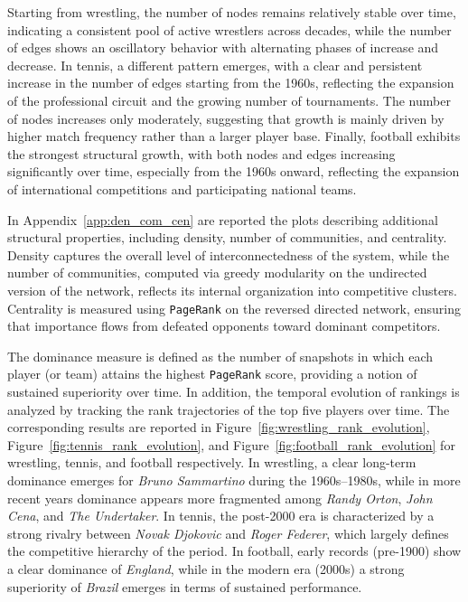 Starting from wrestling, the number of nodes remains relatively stable over time, indicating a consistent pool of active wrestlers across decades, while the number of edges shows an oscillatory behavior with alternating phases of increase and decrease. In tennis, a different pattern emerges, with a clear and persistent increase in the number of edges starting from the 1960s, reflecting the expansion of the professional circuit and the growing number of tournaments. The number of nodes increases only moderately, suggesting that growth is mainly driven by higher match frequency rather than a larger player base. Finally, football exhibits the strongest structural growth, with both nodes and edges increasing significantly over time, especially from the 1960s onward, reflecting the expansion of international competitions and participating national teams.

In Appendix~\ref{app:den_com_cen} are reported the plots describing additional structural properties, including density, number of communities, and centrality. Density captures the overall level of interconnectedness of the system, while the number of communities, computed via greedy modularity on the undirected version of the network, reflects its internal organization into competitive clusters. Centrality is measured using \texttt{PageRank} on the reversed directed network, ensuring that importance flows from defeated opponents toward dominant competitors.

The dominance measure is defined as the number of snapshots in which each player (or team) attains the highest \texttt{PageRank} score, providing a notion of sustained superiority over time. In addition, the temporal evolution of rankings is analyzed by tracking the rank trajectories of the top five players over time. The corresponding results are reported in Figure~\ref{fig:wrestling_rank_evolution}, Figure~\ref{fig:tennis_rank_evolution}, and Figure~\ref{fig:football_rank_evolution} for wrestling, tennis, and football respectively. In wrestling, a clear long-term dominance emerges for \textit{Bruno Sammartino} during the 1960s–1980s, while in more recent years dominance appears more fragmented among \textit{Randy Orton}, \textit{John Cena}, and \textit{The Undertaker}. In tennis, the post-2000 era is characterized by a strong rivalry between \textit{Novak Djokovic} and \textit{Roger Federer}, which largely defines the competitive hierarchy of the period. In football, early records (pre-1900) show a clear dominance of \textit{England}, while in the modern era (2000s) a strong superiority of \textit{Brazil} emerges in terms of sustained performance.

